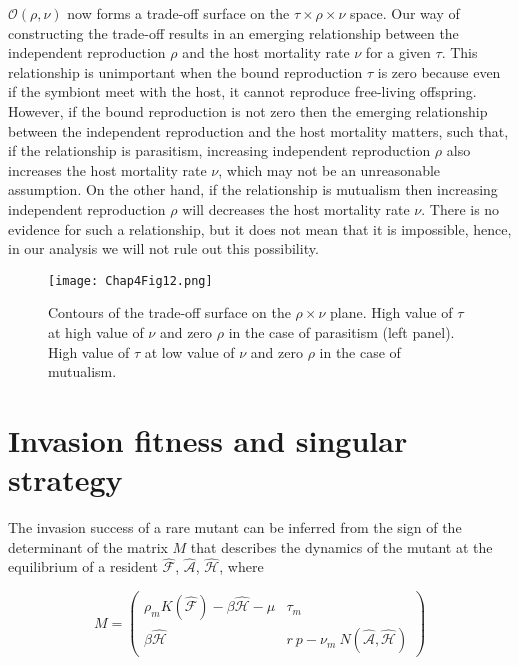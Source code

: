 \documentclass[11.5pt]{article}
\begin{document}
$\mathcal{O}(\rho, \nu)$ now forms a trade-off surface on the $\tau \times \rho \times \nu$ space. Our way of constructing the trade-off results in an emerging relationship between the independent reproduction $\rho$ and the host mortality rate $\nu$ for a given $\tau$. This relationship is unimportant when the bound reproduction $\tau$ is zero because even if the symbiont meet with the host, it cannot reproduce free-living offspring. However, if the bound reproduction is not zero then the emerging relationship between the independent reproduction and the host mortality matters, such that, if the relationship is parasitism, increasing independent reproduction $\rho$ also increases the host mortality rate $\nu$, which may not be an unreasonable assumption. On the other hand, if the relationship is mutualism then increasing independent reproduction $\rho$ will decreases the host mortality rate $\nu$. There is no evidence for such a relationship, but it does not mean that it is impossible, hence, in our analysis we will not rule out this possibility. 

\begin{figure}[H]
    \centering
    \texttt{[image: Chap4Fig12.png]}
    \caption[Contours of the trade-off surface]{Contours of the trade-off surface on the $\rho \times \nu$ plane. High value of $\tau$ at high value of $\nu$ and zero $\rho$ in the case of parasitism (left panel). High value of $\tau$ at low value of $\nu$ and zero $\rho$ in the case of mutualism.}
    \label{Chap5fig12}
\end{figure}

\section{Invasion fitness and singular strategy}

The invasion success of a rare mutant can be inferred from the sign of the determinant of the matrix $M$ that describes the dynamics of the mutant at the equilibrium of a resident $\mathcal{\hat{F}}$, $\mathcal{\hat{A}}$, $\mathcal{\hat{H}}$, where

\begin{equation}
M = 
\begin{pmatrix}
\rho_m K(\mathcal{\hat{F}}) - \beta \mathcal{\hat{H}} - \mu & 
\tau_m
 \\
\beta \mathcal{\hat{H}} & 
r \ p - \nu_m \ N(\mathcal{\hat{A}}, \mathcal{\hat{H}})
\end{pmatrix}
\end{equation}
\end{document}
